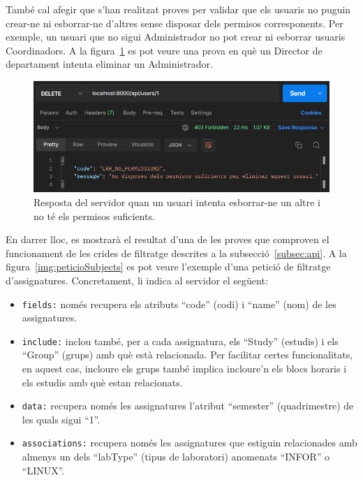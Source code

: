 \documentclass[a4paper,12pt]{ThesisStyle}
\begin{document}
També cal afegir que s'han realitzat proves per validar que els usuaris no puguin crear-ne ni esborrar-ne d'altres sense disposar dels permisos corresponents. Per exemple, un usuari que no sigui Administrador no pot crear ni esborrar usuaris Coordinadors. A la figura~\ref{img:noPermissions} es pot veure una prova en què un Director de departament intenta eliminar un Administrador.

\begin{figure}[H]
  \centering
  \includegraphics[width=\textwidth]{assets/proves/noPermissions.png}
  \caption{\label{img:noPermissions} Resposta del servidor quan un usuari intenta esborrar-ne un altre i no té els permisos suficients.}
\end{figure}

En darrer lloc, es mostrarà el resultat d'una de les proves que comproven el funcionament de les crides de filtratge descrites a la subsecció~\ref{subsec:api}. A la figura~\ref{img:peticioSubjects} es pot veure l'exemple d'una petició de filtratge d'assignatures. Concretament, li indica al servidor el següent:
\begin{itemize}
  \item \texttt{fields:} només recupera els atributs ``code'' (codi) i ``name'' (nom) de les assignatures.
  \item \texttt{include:} inclou també, per a cada assignatura, els ``Study'' (estudis) i els ``Group'' (grups) amb què està relacionada. Per facilitar certes funcionalitats, en aquest cas, incloure els grups també implica incloure'n els blocs horaris i els estudis amb què estan relacionats.
  \item \texttt{data:} recupera només les assignatures l'atribut ``semester'' (quadrimestre) de les quals sigui ``1''.
  \item \texttt{associations:} recupera només les assignatures que estiguin relacionades amb almenys un dels ``labType'' (tipus de laboratori) anomenats ``INFOR'' o ``LINUX''.
\end{itemize}
\end{document}
